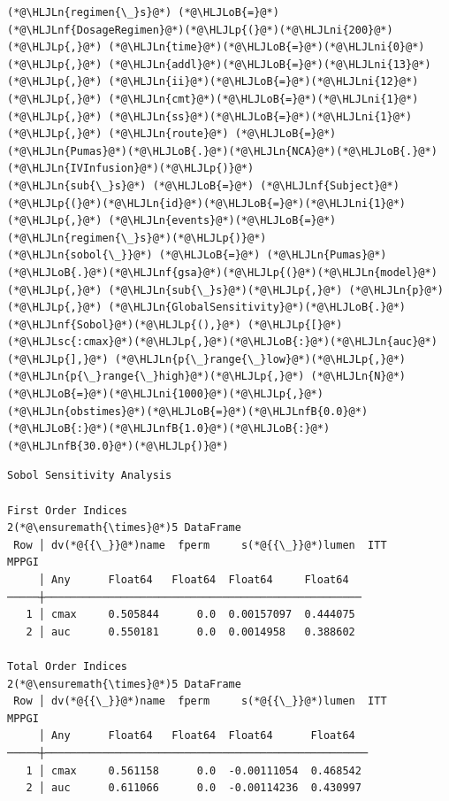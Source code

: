 \documentclass[12pt,a4paper]{article}
\newcommand{\HLJLn}[1]{#1}
\newcommand{\HLJLnf}[1]{\textcolor[RGB]{66,102,213}{#1}}
\newcommand{\HLJLsc}[1]{\textcolor[RGB]{201,61,57}{#1}}
\newcommand{\HLJLnfB}[1]{\textcolor[RGB]{59,151,46}{#1}}
\newcommand{\HLJLni}[1]{\textcolor[RGB]{59,151,46}{#1}}
\newcommand{\HLJLoB}[1]{\textcolor[RGB]{102,102,102}{\textbf{#1}}}
\newcommand{\HLJLp}[1]{#1}
\begin{document}
\begin{lstlisting}
(*@\HLJLn{regimen{\_}s}@*) (*@\HLJLoB{=}@*) (*@\HLJLnf{DosageRegimen}@*)(*@\HLJLp{(}@*)(*@\HLJLni{200}@*)(*@\HLJLp{,}@*) (*@\HLJLn{time}@*)(*@\HLJLoB{=}@*)(*@\HLJLni{0}@*)(*@\HLJLp{,}@*) (*@\HLJLn{addl}@*)(*@\HLJLoB{=}@*)(*@\HLJLni{13}@*)(*@\HLJLp{,}@*) (*@\HLJLn{ii}@*)(*@\HLJLoB{=}@*)(*@\HLJLni{12}@*)(*@\HLJLp{,}@*) (*@\HLJLn{cmt}@*)(*@\HLJLoB{=}@*)(*@\HLJLni{1}@*)(*@\HLJLp{,}@*) (*@\HLJLn{ss}@*)(*@\HLJLoB{=}@*)(*@\HLJLni{1}@*)(*@\HLJLp{,}@*) (*@\HLJLn{route}@*) (*@\HLJLoB{=}@*) (*@\HLJLn{Pumas}@*)(*@\HLJLoB{.}@*)(*@\HLJLn{NCA}@*)(*@\HLJLoB{.}@*)(*@\HLJLn{IVInfusion}@*)(*@\HLJLp{)}@*)
(*@\HLJLn{sub{\_}s}@*) (*@\HLJLoB{=}@*) (*@\HLJLnf{Subject}@*)(*@\HLJLp{(}@*)(*@\HLJLn{id}@*)(*@\HLJLoB{=}@*)(*@\HLJLni{1}@*)(*@\HLJLp{,}@*) (*@\HLJLn{events}@*)(*@\HLJLoB{=}@*)(*@\HLJLn{regimen{\_}s}@*)(*@\HLJLp{)}@*)
(*@\HLJLn{sobol{\_}}@*) (*@\HLJLoB{=}@*) (*@\HLJLn{Pumas}@*)(*@\HLJLoB{.}@*)(*@\HLJLnf{gsa}@*)(*@\HLJLp{(}@*)(*@\HLJLn{model}@*)(*@\HLJLp{,}@*) (*@\HLJLn{sub{\_}s}@*)(*@\HLJLp{,}@*) (*@\HLJLn{p}@*)(*@\HLJLp{,}@*) (*@\HLJLn{GlobalSensitivity}@*)(*@\HLJLoB{.}@*)(*@\HLJLnf{Sobol}@*)(*@\HLJLp{(),}@*) (*@\HLJLp{[}@*)(*@\HLJLsc{:cmax}@*)(*@\HLJLp{,}@*)(*@\HLJLoB{:}@*)(*@\HLJLn{auc}@*)(*@\HLJLp{],}@*) (*@\HLJLn{p{\_}range{\_}low}@*)(*@\HLJLp{,}@*)(*@\HLJLn{p{\_}range{\_}high}@*)(*@\HLJLp{,}@*) (*@\HLJLn{N}@*)(*@\HLJLoB{=}@*)(*@\HLJLni{1000}@*)(*@\HLJLp{,}@*) (*@\HLJLn{obstimes}@*)(*@\HLJLoB{=}@*)(*@\HLJLnfB{0.0}@*)(*@\HLJLoB{:}@*)(*@\HLJLnfB{1.0}@*)(*@\HLJLoB{:}@*)(*@\HLJLnfB{30.0}@*)(*@\HLJLp{)}@*)
\end{lstlisting}

\begin{lstlisting}
Sobol Sensitivity Analysis

First Order Indices
2(*@\ensuremath{\times}@*)5 DataFrame
 Row │ dv(*@{{\_}}@*)name  fperm     s(*@{{\_}}@*)lumen  ITT         MPPGI
     │ Any      Float64   Float64  Float64     Float64
─────┼──────────────────────────────────────────────────
   1 │ cmax     0.505844      0.0  0.00157097  0.444075
   2 │ auc      0.550181      0.0  0.0014958   0.388602

Total Order Indices
2(*@\ensuremath{\times}@*)5 DataFrame
 Row │ dv(*@{{\_}}@*)name  fperm     s(*@{{\_}}@*)lumen  ITT          MPPGI
     │ Any      Float64   Float64  Float64      Float64
─────┼───────────────────────────────────────────────────
   1 │ cmax     0.561158      0.0  -0.00111054  0.468542
   2 │ auc      0.611066      0.0  -0.00114236  0.430997
\end{lstlisting}
\end{document}
